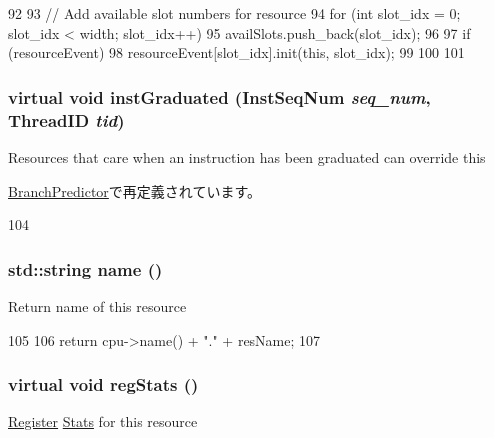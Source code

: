 \begin{DoxyCode}
92 {
93     // Add available slot numbers for resource
94     for (int slot_idx = 0; slot_idx < width; slot_idx++) {
95         availSlots.push_back(slot_idx);
96 
97         if (resourceEvent) {
98             resourceEvent[slot_idx].init(this, slot_idx);
99         }
100     }
101 }
\end{DoxyCode}
\hypertarget{classResource_ad09300971c77caba13bf59e77b99ea24}{
\subsubsection[{instGraduated}]{\setlength{\rightskip}{0pt plus 5cm}virtual void instGraduated ({\bf InstSeqNum} {\em seq\_\-num}, \/  {\bf ThreadID} {\em tid})}}
\label{classResource_ad09300971c77caba13bf59e77b99ea24}
Resources that care when an instruction has been graduated can override this 

\hyperlink{classBranchPredictor_a3f5f4da90448a4c3a3c0533881fb3129}{BranchPredictor}で再定義されています。


\begin{DoxyCode}
104 { }
\end{DoxyCode}
\hypertarget{classResource_af1801e31af6399bccce114ab12575168}{
\subsubsection[{name}]{\setlength{\rightskip}{0pt plus 5cm}std::string name ()}}
\label{classResource_af1801e31af6399bccce114ab12575168}
Return name of this resource 


\begin{DoxyCode}
105 {
106     return cpu->name() + "."  + resName;
107 }
\end{DoxyCode}
\hypertarget{classResource_ac1739a9be0fbd5d96cf441cd3b2c1c78}{
\subsubsection[{regStats}]{\setlength{\rightskip}{0pt plus 5cm}virtual void regStats ()}}
\label{classResource_ac1739a9be0fbd5d96cf441cd3b2c1c78}
\hyperlink{classRegister}{Register} \hyperlink{namespaceStats}{Stats} for this resource 

